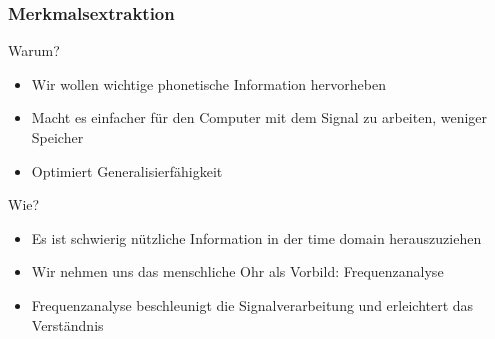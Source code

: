 \subsubsection{Merkmalsextraktion}
Warum? \begin{itemize}
 \item Wir wollen wichtige phonetische Information hervorheben
 \item Macht es einfacher für den Computer mit dem Signal zu arbeiten, weniger Speicher
 \item Optimiert Generalisierfähigkeit
 \end{itemize}
Wie? \begin{itemize}
\item Es ist schwierig nützliche Information in der time domain herauszuziehen
\item Wir nehmen uns das menschliche Ohr als Vorbild: Frequenzanalyse
\item Frequenzanalyse beschleunigt die Signalverarbeitung und erleichtert das Verständnis
\end{itemize}

